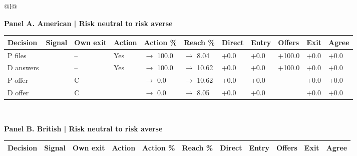 \documentclass[10pt,border=5pt]{standalone}
\begin{document}
\begin{tabular}{@{}l@{}}
\begin{minipage}{18.420cm}
\small
\setlength{\tabcolsep}{3pt}
\renewcommand{\arraystretch}{1.25}
\noindent\textbf{Panel A. American | Risk neutral to risk averse}\par\smallskip
\begin{tabular}{@{}>{\raggedright\arraybackslash}p{2.600cm}>{\centering\arraybackslash}p{1.150cm}>{\centering\arraybackslash}p{0.700cm}>{\centering\arraybackslash}p{1.150cm}>{\centering\arraybackslash}p{2.300cm}>{\centering\arraybackslash}p{2.350cm}>{\centering\arraybackslash}p{1.150cm}>{\centering\arraybackslash}p{1.150cm}>{\centering\arraybackslash}p{1.150cm}>{\centering\arraybackslash}p{1.150cm}>{\centering\arraybackslash}p{1.150cm}@{}}
\toprule
\textbf{Decision} & \textbf{Signal} & \textbf{Own exit} & \textbf{Action} & \textbf{Action \%} & \textbf{Reach \%} & \textbf{Direct} & \textbf{Entry} & \textbf{Offers} & \textbf{Exit} & \textbf{Agree}\\\midrule
P files & 0.05 & -- & Yes & 0.0 $\to$ 100.0 & 8.04 $\to$ 8.04 & +0.0 & +0.0 & +100.0 & +0.0 & +0.0\\
D answers & 0.75 & -- & Yes & 0.0 $\to$ 100.0 & 10.33 $\to$ 10.62 & +0.0 & +0.0 & +100.0 & +0.0 & +0.0\\
P offer & 0.25 & C & 0.05 & 100.0 $\to$ 0.0 & 8.34 $\to$ 10.62 & +0.0 & +0.0 & -100.0 & +0.0 & +0.0\\
D offer & 0.05 & C & 0.05 & 100.0 $\to$ 0.0 & 4.05 $\to$ 8.05 & +0.0 & +0.0 & -100.0 & +0.0 & +0.0\\
\bottomrule\end{tabular}
\end{minipage}
\\[12pt]
\noalign{\vskip 4pt}
\begin{minipage}{18.420cm}
\small
\setlength{\tabcolsep}{3pt}
\renewcommand{\arraystretch}{1.25}
\noindent\textbf{Panel B. British | Risk neutral to risk averse}\par\smallskip
\begin{tabular}{@{}>{\raggedright\arraybackslash}p{2.600cm}>{\centering\arraybackslash}p{1.150cm}>{\centering\arraybackslash}p{0.700cm}>{\centering\arraybackslash}p{1.150cm}>{\centering\arraybackslash}p{2.300cm}>{\centering\arraybackslash}p{2.350cm}>{\centering\arraybackslash}p{1.150cm}>{\centering\arraybackslash}p{1.150cm}>{\centering\arraybackslash}p{1.150cm}>{\centering\arraybackslash}p{1.150cm}>{\centering\arraybackslash}p{1.150cm}@{}}
\toprule
\textbf{Decision} & \textbf{Signal} & \textbf{Own exit} & \textbf{Action} & \textbf{Action \%} & \textbf{Reach \%} & \textbf{Direct} & \textbf{Entry} & \textbf{Offers} & \textbf{Exit} & \textbf{Agree}\\\midrule

\end{tabular}
\end{minipage}
\end{tabular}
\end{document}
